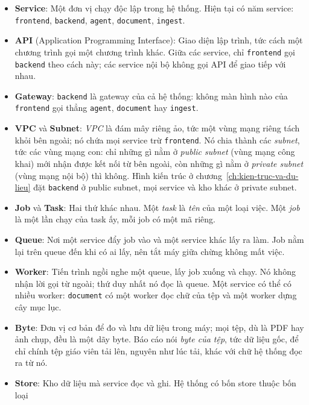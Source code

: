 \begin{itemize}
  \item \textbf{Service}: Một đơn vị chạy độc lập trong hệ thống. Hiện tại có năm service: \texttt{frontend},
        \texttt{backend}, \texttt{agent}, \texttt{document}, \texttt{ingest}.
  \item \textbf{API} (Application Programming Interface): Giao diện lập trình, tức cách một chương trình gọi một chương trình khác. 
        Giữa các service, chỉ \texttt{frontend} gọi \texttt{backend} theo cách này; 
        các service nội bộ không gọi API để giao tiếp với nhau.
  \item \textbf{Gateway}: \texttt{backend} là gateway của cả hệ thống:
        không màn hình nào của \texttt{frontend} gọi thẳng \texttt{agent}, \texttt{document} hay \texttt{ingest}.
  \item \textbf{VPC} và \textbf{Subnet}: \emph{VPC} là đám mây riêng ảo, tức một vùng mạng riêng
        tách khỏi bên ngoài; nó chứa mọi service trừ \texttt{frontend}. Nó chia thành các
        \emph{subnet}, tức các vùng mạng con: chỉ những gì nằm ở \emph{public subnet} (vùng mạng
        công khai) mới nhận được kết nối từ bên ngoài, còn những gì nằm ở \emph{private subnet}
        (vùng mạng nội bộ) thì không. Hình kiến trúc ở
        chương~\ref{ch:kien-truc-va-du-lieu} đặt \texttt{backend} ở public subnet, mọi service và
        kho khác ở private subnet.
  \item \textbf{Job} và \textbf{Task}: Hai thứ khác nhau. Một \emph{task} là \emph{tên} của một loại
        việc. Một \emph{job} là một lần chạy của task ấy, mỗi job có một mã riêng.
  \item \textbf{Queue}: Nơi một service đẩy job vào và một service khác lấy ra làm. Job nằm lại
        trên queue đến khi có ai lấy, nên tắt máy giữa chừng không mất việc.
  \item \textbf{Worker}: Tiến trình ngồi nghe một queue, lấy job xuống và chạy. Nó không nhận lời
        gọi từ ngoài; thứ duy nhất nó đọc là queue. Một service có thể có nhiều worker:
        \texttt{document} có một worker đọc chữ của tệp và một worker dựng cây mục lục.
  \item \textbf{Byte}: Đơn vị cơ bản để đo và lưu dữ liệu trong máy; mọi tệp, dù là PDF hay ảnh
        chụp, đều là một dãy byte. Báo cáo nói \emph{byte của tệp}, tức dữ liệu gốc, để chỉ chính
        tệp giáo viên tải lên, nguyên như lúc tải, khác với chữ hệ thống đọc ra từ nó.
  \item \textbf{Store}: Kho dữ liệu mà service đọc và ghi. Hệ thống có bốn store thuộc bốn loại

\end{itemize}
